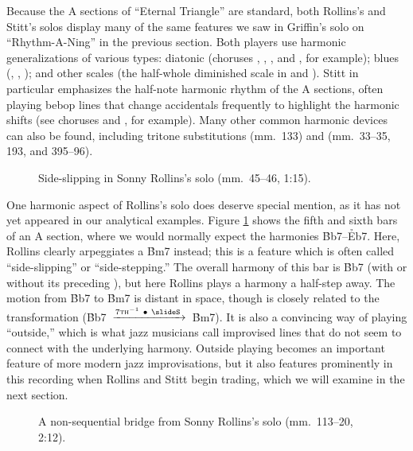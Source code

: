 Because the A sections of ``Eternal Triangle'' are standard, both Rollins's
and Stitt's solos display many of the same features we saw in Griffin's solo
on ``Rhythm-A-Ning'' in the previous section. Both players use harmonic
generalizations of various types: diatonic (choruses , ,
, and , for example); blues (, ,
); and other scales (the half-whole diminished scale in
 and ). Stitt in particular emphasizes the half-note
harmonic rhythm of the A sections, often playing bebop lines that change
accidentals frequently to highlight the harmonic shifts (see choruses
 and , for example). Many other common harmonic devices
can also be found, including tritone substitutions (mm.~133) and 
(mm.~33--35, 193, and 395--96).

\begin{figure}[tbp]
  \vspace{1em}
  \caption[Side-slipping in Sonny Rollins's solo.]{%
    Side-slipping in Sonny Rollins's solo (mm.~45--46, 1:15).}
  \label{et:sr-side-slipping}
\end{figure}

One harmonic aspect of Rollins's solo does deserve special mention, as it has
not yet appeared in our analytical examples. Figure \ref{et:sr-side-slipping}
shows the fifth and sixth bars of an A section, where we would normally expect
the harmonies \h{Bb7}--\h{Eb7}. Here, Rollins clearly arpeggiates a \h{Bm7}
instead; this is a feature which is often called ``side-slipping'' or
``side-stepping.'' The overall harmony of this bar is \h{Bb7} (with
or without its preceding \ii), but here Rollins plays a harmony a half-step
away. The motion from \h{Bb7} to \h{Bm7} is distant in \tf space, though is
closely related to the \slideS transformation \mbox{(\h{Bb7}
  $\xrightarrow{7\text{\textsc{th}}^{-1}\ \bullet\ \text{\slideS}\,}$
  \h{Bm7})}. It is also a convincing way of playing ``outside,''
which is what jazz musicians call improvised lines that do not seem to connect
with the underlying harmony. Outside playing becomes an important
feature of more modern jazz improvisations, but it also features prominently
in this recording when Rollins and Stitt begin trading, which we will examine
in the next section.

\begin{figure}[tbp]
  \caption[A non-sequential bridge from Sonny Rollins's solo.]{%
    A non-sequential bridge from Sonny Rollins's solo (mm.~113--20, 2:12).}
  \label{et:sr-non-seq}
\end{figure}

